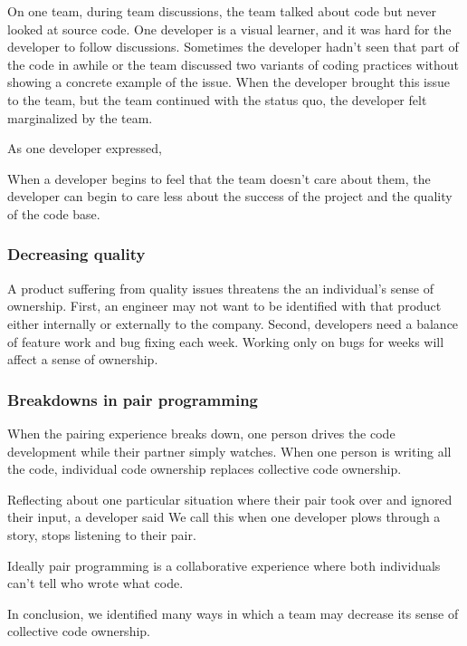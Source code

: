 On one team, during team discussions, the team talked about code but never looked at source code. One developer is a visual learner, and it was hard for the developer to follow discussions. Sometimes the developer hadn’t seen that part of the code in awhile or the team discussed two variants of coding practices without showing a concrete example of the issue. When the developer brought this issue to the team, but the team continued with the status quo, the developer felt marginalized by the team.

As one developer expressed, 

When a developer begins to feel that the team doesn't care about them, the developer can begin to care less about the success of the project and the quality of the code base. 

\subsubsection{Decreasing quality}
A product suffering from quality issues threatens the an individual's sense of ownership. First, an engineer may not want to be identified with that product either internally or externally to the company. Second, developers need a balance of feature work and bug fixing each week. Working only on bugs for weeks will affect a sense of ownership.    
 
\subsubsection{Breakdowns in pair programming }
When the pairing experience breaks down, one person drives the code development while their partner simply watches. When one person is writing all the code, individual code ownership replaces collective code ownership.  

Reflecting about one particular situation where their pair took over and ignored their input, a developer said  We call this   when one developer plows through a story, stops listening to their pair. 

Ideally pair programming is a collaborative experience where both individuals can't tell who wrote what code. 

In conclusion, we identified many ways in which a team may decrease its sense of collective code ownership.
